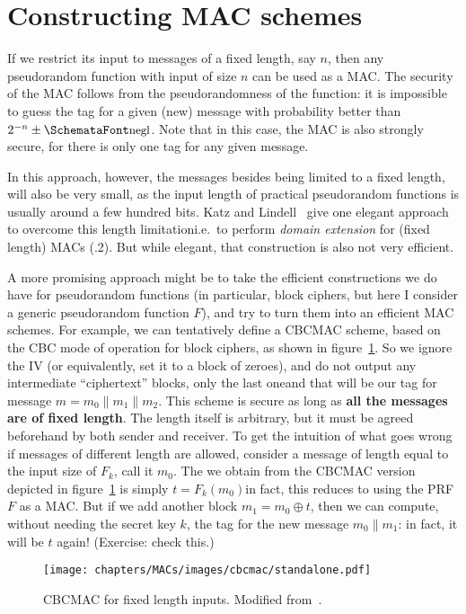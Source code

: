 \section{Constructing MAC schemes}
  \label{sec:mac_constructions}
  If we restrict its input to messages of a fixed length, say $n$, then any pseudorandom function with input of size $n$ can be used as a MAC. The security of the MAC follows from the pseudorandomness of the function: it is impossible to guess the tag for a given (new) message with probability better than $2^{-n} \pm \myemph{negl}$. Note that in this case, the MAC is also strongly secure, for there is only one tag for any given message.

  In this approach, however, the messages besides being limited to a fixed length, will also be very small, as the input length of practical pseudorandom functions is usually around a few hundred bits. Katz and Lindell~\cite{KatzLindell:IMC} give one elegant approach to overcome this length limitation\emd i.e.\ to perform \emph{domain extension} for (fixed length) MACs (.2). But while elegant, that construction is also not very efficient.

  A more promising approach might be to take the efficient constructions we do have for pseudorandom functions (in particular, block ciphers, but here I consider a generic pseudorandom function $F$), and try to turn them into an efficient MAC schemes. For example, we can tentatively define a CBCMAC scheme, based on the CBC mode of operation for block ciphers, as shown in figure~\ref{fig:cbcmac_fixed_length_msgs}. So we ignore the IV (or equivalently, set it to a block of zeroes), and do not output any intermediate ``ciphertext'' blocks, only the last one\emd and that will be our tag for message $m = m_0\|m_1\|m_2$. This scheme is secure as long as \textbf{all the messages are of fixed length}. The length itself is arbitrary, but it must be agreed beforehand by both sender and receiver. To get the intuition of what goes wrong if messages of different length are allowed, consider a message of length equal to the input size of $F_k$, call it $m_0$. The we obtain from the CBCMAC version depicted in figure~\ref{fig:cbcmac_fixed_length_msgs} is simply $t = F_k(m_0)$\emd in fact, this reduces to using the PRF $F$ as a MAC. But if we add another block $m_1 = m_0 \oplus t$, then we can compute, without needing the secret key $k$, the tag for the new message $m_0\|m_1$: in fact, it will be $t$ again! (Exercise: check this.)
  \begin{figure}
    \centering
    \texttt{[image: chapters/MACs/images/cbcmac/standalone.pdf]}
    \caption{CBCMAC for fixed length inputs. Modified from~\cite{Benoit:CBCMAC}.}
    \label{fig:cbcmac_fixed_length_msgs}
  \end{figure}

